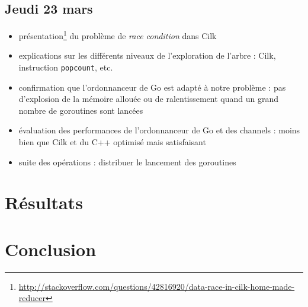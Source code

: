 \documentclass[12pt,a4paper]{article}
\begin{document}
\subsection*{Jeudi 23 mars}
\begin{itemize}
	\item	présentation\footnote{\url{http://stackoverflow.com/questions/42816920/data-race-in-cilk-home-made-reducer}} du problème de \emph{race condition} dans Cilk
	\item	explications sur les différents niveaux de l'exploration de l'arbre : Cilk, instruction \texttt{popcount}, etc.
	\item	confirmation que l'ordonnanceur de Go est adapté à notre problème : pas d'explosion de la mémoire allouée ou de ralentissement quand un grand nombre de goroutines sont lancées
	\item	évaluation des performances de l'ordonnanceur de Go et des channels : moins bien que Cilk et du C++ optimisé mais satisfaisant
	\item	suite des opérations : distribuer le lancement des goroutines
\end{itemize}

\section*{Résultats}

\section*{Conclusion}
\end{document}
